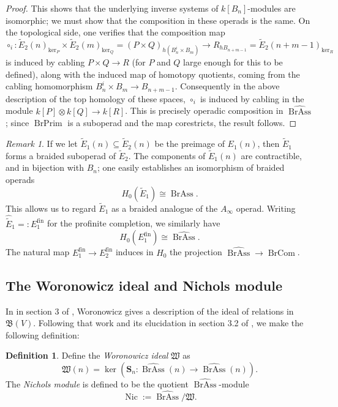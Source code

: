 \documentclass[12pt]{article}
\DeclareMathOperator{\fin}{fin}
\DeclareMathOperator{\Nic}{Nic}
\DeclareMathOperator{\BrAss}{BrAss}
\DeclareMathOperator{\BrPrim}{BrPrim}
\DeclareMathOperator{\BrCom}{BrCom}
\newcommand{\BrAsshat}{\widehat{\BrAss}} %
\newcommand{\Ct} {\widetilde{E}}
\newcommand{\bS} {\mathbf{S}}
\newcommand{\mB}{\mathfrak{B}}
\newcommand{\mW}{\mathfrak{W}}
\theoremstyle{plain}
\theoremstyle{definition}
\newtheorem{defn}[thm]{Definition}
\theoremstyle{remark}
\newtheorem{rem}[thm]{Remark}
\begin{document}
\begin{proof}
This shows that the underlying inverse systems of $k[B_n]$-modules are isomorphic; we must show that the composition in these operads is the same.  On the topological side, one verifies that the composition map %
%
$$\circ_i: \Ct_2(n)_{\ker_P} \times \Ct_2(m)_{\ker_Q} = (P \times Q)_{h(B_n^i \times B_m)} \to R_{hB_{n+m-1}} = \Ct_2(n+m-1)_{\ker_R}$$
%
is induced by cabling $P \times Q \to R$ (for $P$ and $Q$ large enough for this to be defined), along with the induced map of homotopy quotients, coming from the cabling homomorphism $B_n^i \times B_m \to B_{n+m-1}$.  Consequently in the above description of the top homology of these spaces, $\circ_i$ is induced by cabling in the module $k[P] \otimes k[Q] \to k[R]$.  This is precisely operadic composition in $\BrAsshat$; since $\BrPrim$ is a suboperad and the map corestricts, the result follows.

\end{proof}

\begin{rem} If we let $\Ct_1(n) \subseteq \Ct_2(n)$ be the preimage of $E_1(n)$, then $\Ct_1$ forms a braided suboperad of $\Ct_2$.  The components of $\Ct_1(n)$ are contractible, and in bijection with $B_n$; one easily establishes an isomorphism of braided operads
%
$$H_0(\Ct_1) \cong \BrAss.$$
%
This allows us to regard $\Ct_1$ as a braided analogue of the $A_{\infty}$ operad.  Writing $\widehat{\Ct}_1 =: E_1^{\fin}$ for the profinite completion, we similarly have 
%
$$H_0(E_1^{\fin}) \cong \BrAsshat.$$
%
The natural map $E_1^{\fin} \to E_2^{\fin}$ induces in $H_0$ the projection $\BrAsshat \to \BrCom$.

\end{rem}

\subsection{The Woronowicz ideal and Nichols module}  \label{w_section}

In in section 3 of \cite{woronowicz}, Woronowicz gives a description of the ideal of relations in $\mB(V)$.  Following that work and its elucidation in section 3.2 of \cite{bazlov}, we make the following definition:

\begin{defn}

Define the \emph{Woronowicz ideal} $\mW$ as 
%
$$\mW(n) = \ker\left(\bS_n: \BrAsshat(n) \to \BrAsshat(n)\right).$$
%
The \emph{Nichols module} is defined to be the quotient $\BrAsshat$-module
%
$$\Nic := \BrAsshat / \mW.$$  

\end{defn}
\end{document}
